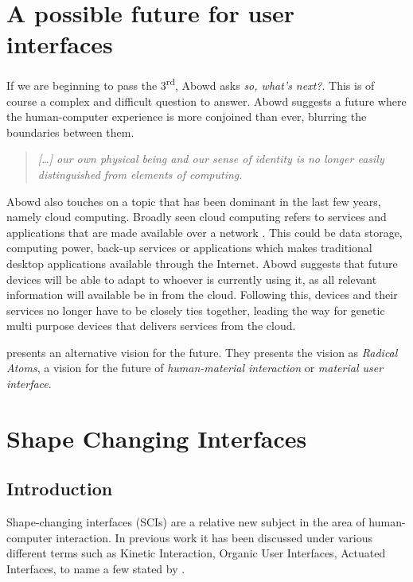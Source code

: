 \section{A possible future for user interfaces}
If we are beginning to pass the 3\textsuperscript{rd}, Abowd asks \textit{so, what's next?}.
This is of course a complex and difficult question to answer.
Abowd suggests a future where the human-computer experience is more conjoined than ever, blurring the boundaries between them.
\begin{quote}
\emph{[\ldots] our own physical being and our sense of identity is no longer easily distinguished from elements of computing.}
\end{quote}
Abowd also touches on a topic that has been dominant in the last few years, namely cloud computing.
Broadly seen cloud computing refers to services and applications that are made available over a network .
This could be data storage, computing power, back-up services or applications which makes traditional desktop applications available through the Internet.
Abowd suggests that future devices will be able to adapt to whoever is currently using it, as all relevant information will available be in from the cloud.
Following this, devices and their services no longer have to be closely ties together, leading the way for genetic multi purpose devices that delivers services from the cloud.

\citet{ishii2012radical} presents an alternative vision for the future.
They presents the vision as \textit{Radical Atoms}, a vision for the future of \textit{human-material interaction} or \textit{material user interface}. 


\section{Shape Changing Interfaces}
\subsection{Introduction}
Shape-changing interfaces (SCIs) are a relative new subject in the area of human-computer interaction.
In previous work it has been discussed under various different terms such as Kinetic Interaction, Organic User Interfaces, Actuated Interfaces, to name a few stated by \citet{rasmussen2012shape}.

